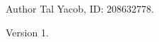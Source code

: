 \begin{DoxyAuthor}{Author}
Tal Yacob, ID\+: 208632778. 
\end{DoxyAuthor}
\begin{DoxyVersion}{Version}
1. 
\end{DoxyVersion}
